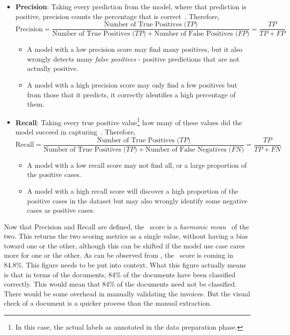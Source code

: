 \begin{itemize}
	\item \textbf{Precision}: Taking every prediction from the model, where that prediction is positive,
	      precision counts the percentage that is correct~\autocite{korstanjeF1Score2021}. Therefore,
		  \begingroup\smaller
	      \[
		      \text{Precision} =
		      \frac{\text{Number of True Positives ($TP$)}}
		      {\text{Number of True Positives ($TP$)} + \text{Number of False Positives ($FP$)}}
		      =
		      \frac{ {TP} }{{TP}+{FP}}
	      \]\endgroup
	      \begin{itemize}
		      \item A model with a low precision score may find many positives, but it also wrongly detects
		            many \emph{false positives} - positive predictions that are not actually positive.
		      \item A model with a high precision score may only find a few positives but from those that it predicts,
		            it correctly identifies a high percentage of them.
	      \end{itemize}
	\item \textbf{Recall}: Taking every true positive value\footnote{In this case, the actual labels as annotated in the
		      data preparation phase.} how many of these values did the model succeed in capturing~\autocite{korstanjeF1Score2021}. Therefore,
		  \begingroup\smaller
	      \[
		      \text{Recall} =
		      \frac{\text{Number of True Positives ($TP$)}}
		      {\text{Number of True Positives ($TP$)} + \text{Number of False Negatives ($FN$)}}
		      =
		      \frac{ {TP} }{{TP}+{FN}}
	      \]\endgroup
	      \begin{itemize}
		      \item A model with a low recall score may not find all, or a large proportion of the positive cases.
		      \item A model with a high recall score will discover a high proportion of the positive cases in the dataset but may also wrongly
		            identify some negative cases as positive cases.
	      \end{itemize}
\end{itemize}
Now that Precision and Recall are defined, the \FO\ score is a \emph{harmonic mean}~\autocite{HarmonicMean2022} of the two.
This returns the two scoring metrics as a single value, without having a bias toward one or the other, although this
can be shifted if the model use case cares more for one or the other.
\bigbreak
As can be observed from , the \FO\ score is coming in 84.8\%. This figure needs to be put into
context. What this figure actually means is that in terms of the documents, 84\% of the documents have been classified correctly.
This would mean that 84\% of the documents need not be classified. There would be some overhead in manually validating the
invoices. But the visual check of a document is a quicker process than the manual extraction. 
